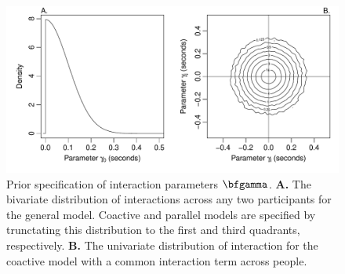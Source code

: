 \documentclass[fignum,nobf,man]{apa}
\begin{document}
\begin{figure}
\centering
\includegraphics[width=6.5in]{gammaPriors.pdf}
\caption{Prior specification of interaction parameters $\bfgamma$.  {\bf A.} The bivariate distribution of interactions across any two participants for the general model.  Coactive and parallel models are specified by trunctating this distribution to the first and third quadrants, respectively.  {\bf B.} The univariate distribution of interaction for the coactive model with a common interaction term across people.}
\label{gammPrior}
\end{figure}
\end{document}
